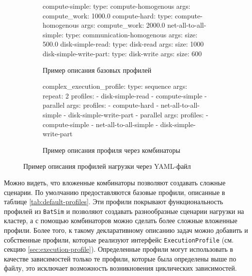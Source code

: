 \begin{figure}[h!]
    \footnotesize
\begin{subfigure}{0.5\textwidth}
    \begin{yamlcode}
    compute-simple: 
      type: compute-homogenous
      args: 
        compute_work: 1000.0 
    compute-hard:
      type: compute-homogenous
      args:
        compute_work: 2000.0
    net-all-to-all-simple:
      type: communication-homogenous
      args: 
        size: 500.0 
    disk-simple-read: 
      type: disk-read 
      args: 
        size: 1000
    disk-simple-write-part: 
      type: disk-write 
      args: 
        size: 600  
    \end{yamlcode}
    \caption{Пример описания базовых профилей}
    \label{fig:profile-yaml-base}
\end{subfigure}
\begin{subfigure}{0.5\textwidth}
    \begin{yamlcode}
complex_execution_profile:
  type: sequence
  args:
    repeat: 2
    profiles:
      - disk-simple-read
      - compute-simple
      - parallel
        args:
          profiles:
            - compute-hard
            - net-all-to-all-simple
      - disk-simple-write-part
      - parallel
        args:
          profiles:
            - compute-simple
            - net-all-to-all-simple
      - disk-simple-write-part
\end{yamlcode}
    \caption{Пример описания профиля через комбинаторы}
    \label{fig:profile-yaml-complex}
\end{subfigure}
\caption{Пример описания профилей нагрузки через YAML-файл}
\label{fig:profile-yaml}
\end{figure}

Можно видеть, что вложенные комбинаторы позволяют создавать сложные сценарии. По умолчанию предоставляются базовые профили, описанные в таблице \ref{tab:default-profiles}. Эти профили покрывают функциональность профилей из \texttt{BatSim}\cite{batsim-profile-types-overview} и позволяют создавать разнообразные сценарии нагрузки на кластер, а с помощью комбинаторов можно сделать более сложные вложенные профили. Более того, к такому декларативному описанию задач можно добавить и собственные профили, которые реализуют интерфейс \texttt{ExecutionProfile} (см. секцию \ref{sec:execution-profile}). Определенные профили могут использовать в качестве зависимостей только те профили, которые была определены выше по файлу, это исключает возможность возникновения циклических зависимостей. 

